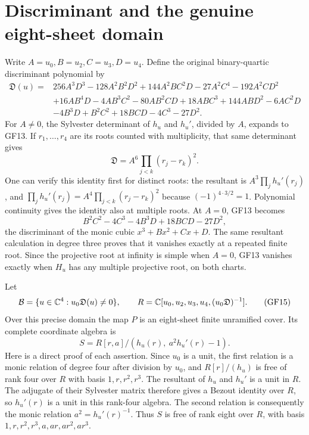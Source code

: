 \section{Discriminant and the genuine eight-sheet domain}
Write $A=u_0,B=u_2,C=u_3,D=u_4$. Define the original binary-quartic
discriminant polynomial by
\begin{align}
 \mathfrak D(u)={}&256A^3D^3-128A^2B^2D^2+144A^2BC^2D
 -27A^2C^4-192A^2CD^2\nonumber\\
 &+16AB^4D-4AB^3C^2-80AB^2CD+18ABC^3
 +144ABD^2-6AC^2D\nonumber\\
 &-4B^3D+B^2C^2+18BCD-4C^3-27D^2.
 \tag{GF13}
\end{align}
For $A\ne0$, the Sylvester determinant of $h_u$ and $h_u'$,
divided by $A$, expands to GF13. If $r_1,\ldots,r_4$ are its
roots counted with multiplicity, that same determinant gives
\begin{equation}
 \mathfrak D=A^6\prod_{j<k}(r_j-r_k)^2.\tag{GF14}
\end{equation}
One can verify this identity first for distinct roots: the
resultant is $A^3\prod_jh_u'(r_j)$, and
$\prod_jh_u'(r_j)=A^4\prod_{j<k}(r_j-r_k)^2$ because
$(-1)^{4\cdot3/2}=1$. Polynomial continuity gives the identity
also at multiple roots. At $A=0$, GF13 becomes
\[
 B^2C^2-4C^3-4B^3D+18BCD-27D^2,
\]
the discriminant of the monic cubic $x^3+Bx^2+Cx+D$. The same
resultant calculation in degree three proves that it vanishes
exactly at a repeated finite root. Since the projective root at
infinity is simple when $A=0$, GF13 vanishes exactly when $H_u$
has any multiple projective root, on both charts.

Let
\begin{equation}
 \mathcal B=\{u\in\mathbb C^4:u_0\mathfrak D(u)\ne0\},\qquad
 R=\mathbb C[u_0,u_2,u_3,u_4,(u_0\mathfrak D)^{-1}].\tag{GF15}
\end{equation}
Over this precise domain the map $P$ is an eight-sheet finite
unramified cover. Its complete coordinate algebra is
\begin{equation}
 S=R[r,a]/(h_u(r),\ a^2h_u'(r)-1).\tag{GF16}
\end{equation}
Here is a direct proof of each assertion. Since $u_0$ is a unit,
the first relation is a monic relation of degree four after division
by $u_0$, and $R[r]/(h_u)$ is free of rank four over $R$ with basis
$1,r,r^2,r^3$. The resultant of $h_u$ and $h_u'$ is a unit in $R$.
The adjugate of their Sylvester matrix therefore gives a Bezout
identity over $R$, so $h_u'(r)$ is a unit in this rank-four algebra.
The second relation is consequently the monic relation
$a^2=h_u'(r)^{-1}$. Thus $S$ is free of rank eight over $R$, with
basis $1,r,r^2,r^3,a,ar,ar^2,ar^3$.


